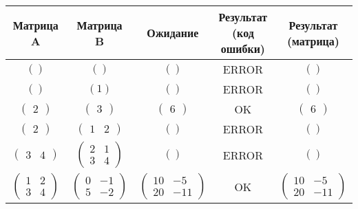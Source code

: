 \vspace{0.25cm}
\begin{table}[H]
    \centering
    \renewcommand{\arraystretch}{1.5} %
    \begin{tabular}{|c|c|c|c|c|}
        \hline
        \textbf{Матрица A} & \textbf{Матрица B} & \textbf{Ожидание} & \makecell{\textbf{Результат}\\ \textbf{(код ошибки)}} & \makecell{\textbf{Результат}\\ \textbf{(матрица)}} \\
        \hline
        $\left( \right)$ & $\left( \right)$ & $\left( \right)$ & ERROR & $\left( \right)$ \\
        $\left( \right)$ & $\left( 1 \right)$ & $\left( \right)$ & ERROR & $\left( \right)$ \\
        $\left( \begin{matrix} 2 \end{matrix} \right)$ & $\left( \begin{matrix} 3 \end{matrix} \right)$ & $\left( \begin{matrix} 6 \end{matrix} \right)$ & OK & $\left( \begin{matrix} 6 \end{matrix} \right)$ \\
        $\left( \begin{matrix} 2 \end{matrix} \right)$ & $\left( \begin{matrix} 1 & 2 \end{matrix} \right)$ & $\left( \right)$ & ERROR & $\left( \right)$ \\
        $\left( \begin{matrix} 3 & 4 \end{matrix} \right)$ & $\left( \begin{matrix} 2 & 1 \\ 3 & 4 \end{matrix} \right)$ & $\left( \right)$ & ERROR & $\left( \right)$ \\
        $\left( \begin{matrix} 1 & 2 \\ 3 & 4 \end{matrix} \right)$ & $\left( \begin{matrix} 0 & -1 \\ 5 & -2 \end{matrix} \right)$ & $\left( \begin{matrix} 10 & -5 \\ 20 & -11 \end{matrix} \right)$ & OK & $\left( \begin{matrix} 10 & -5 \\ 20 & -11 \end{matrix} \right)$ \\

\end{tabular}
\end{table}
